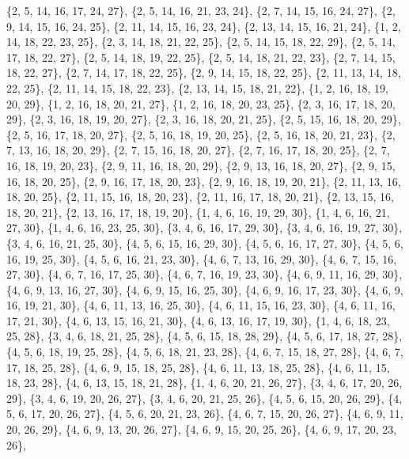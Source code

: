 \documentclass[11pt,a4paper]{article}
\begin{document}
{\{2, 5, 14, 16, 17, 24, 27\}, \{2, 5, 14, 16, 21, 23, 24\}, \{2, 7, 14, 15, 16, 24, 27\}, \{2, 9, 14, 15, 16, 24, 25\}, \{2, 11, 14, 15, 16, 23, 24\},
\{2, 13, 14, 15, 16, 21, 24\}, \{1, 2, 14, 18, 22, 23, 25\}, \{2, 3, 14, 18, 21, 22, 25\}, \{2, 5, 14, 15, 18, 22, 29\}, \{2, 5, 14, 17, 18, 22, 27\},
\{2, 5, 14, 18, 19, 22, 25\}, \{2, 5, 14, 18, 21, 22, 23\}, \{2, 7, 14, 15, 18, 22, 27\}, \{2, 7, 14, 17, 18, 22, 25\}, \{2, 9, 14, 15, 18, 22, 25\},
\{2, 11, 13, 14, 18, 22, 25\}, \{2, 11, 14, 15, 18, 22, 23\}, \{2, 13, 14, 15, 18, 21, 22\}, \{1, 2, 16, 18, 19, 20, 29\}, \{1, 2, 16, 18, 20, 21, 27\},
\{1, 2, 16, 18, 20, 23, 25\}, \{2, 3, 16, 17, 18, 20, 29\}, \{2, 3, 16, 18, 19, 20, 27\}, \{2, 3, 16, 18, 20, 21, 25\}, \{2, 5, 15, 16, 18, 20, 29\},
\{2, 5, 16, 17, 18, 20, 27\}, \{2, 5, 16, 18, 19, 20, 25\}, \{2, 5, 16, 18, 20, 21, 23\}, \{2, 7, 13, 16, 18, 20, 29\}, \{2, 7, 15, 16, 18, 20, 27\},
\{2, 7, 16, 17, 18, 20, 25\}, \{2, 7, 16, 18, 19, 20, 23\}, \{2, 9, 11, 16, 18, 20, 29\}, \{2, 9, 13, 16, 18, 20, 27\}, \{2, 9, 15, 16, 18, 20, 25\},
\{2, 9, 16, 17, 18, 20, 23\}, \{2, 9, 16, 18, 19, 20, 21\}, \{2, 11, 13, 16, 18, 20, 25\}, \{2, 11, 15, 16, 18, 20, 23\}, \{2, 11, 16, 17, 18, 20, 21\},
\{2, 13, 15, 16, 18, 20, 21\}, \{2, 13, 16, 17, 18, 19, 20\}, \{1, 4, 6, 16, 19, 29, 30\}, \{1, 4, 6, 16, 21, 27, 30\}, \{1, 4, 6, 16, 23, 25, 30\},
\{3, 4, 6, 16, 17, 29, 30\}, \{3, 4, 6, 16, 19, 27, 30\}, \{3, 4, 6, 16, 21, 25, 30\}, \{4, 5, 6, 15, 16, 29, 30\}, \{4, 5, 6, 16, 17, 27, 30\},
\{4, 5, 6, 16, 19, 25, 30\}, \{4, 5, 6, 16, 21, 23, 30\}, \{4, 6, 7, 13, 16, 29, 30\}, \{4, 6, 7, 15, 16, 27, 30\}, \{4, 6, 7, 16, 17, 25, 30\},
\{4, 6, 7, 16, 19, 23, 30\}, \{4, 6, 9, 11, 16, 29, 30\}, \{4, 6, 9, 13, 16, 27, 30\}, \{4, 6, 9, 15, 16, 25, 30\}, \{4, 6, 9, 16, 17, 23, 30\},
\{4, 6, 9, 16, 19, 21, 30\}, \{4, 6, 11, 13, 16, 25, 30\}, \{4, 6, 11, 15, 16, 23, 30\}, \{4, 6, 11, 16, 17, 21, 30\}, \{4, 6, 13, 15, 16, 21, 30\},
\{4, 6, 13, 16, 17, 19, 30\}, \{1, 4, 6, 18, 23, 25, 28\}, \{3, 4, 6, 18, 21, 25, 28\}, \{4, 5, 6, 15, 18, 28, 29\}, \{4, 5, 6, 17, 18, 27, 28\},
\{4, 5, 6, 18, 19, 25, 28\}, \{4, 5, 6, 18, 21, 23, 28\}, \{4, 6, 7, 15, 18, 27, 28\}, \{4, 6, 7, 17, 18, 25, 28\}, \{4, 6, 9, 15, 18, 25, 28\},
\{4, 6, 11, 13, 18, 25, 28\}, \{4, 6, 11, 15, 18, 23, 28\}, \{4, 6, 13, 15, 18, 21, 28\}, \{1, 4, 6, 20, 21, 26, 27\}, \{3, 4, 6, 17, 20, 26, 29\},
\{3, 4, 6, 19, 20, 26, 27\}, \{3, 4, 6, 20, 21, 25, 26\}, \{4, 5, 6, 15, 20, 26, 29\}, \{4, 5, 6, 17, 20, 26, 27\}, \{4, 5, 6, 20, 21, 23, 26\},
\{4, 6, 7, 15, 20, 26, 27\}, \{4, 6, 9, 11, 20, 26, 29\}, \{4, 6, 9, 13, 20, 26, 27\}, \{4, 6, 9, 15, 20, 25, 26\}, \{4, 6, 9, 17, 20, 23, 26\},
}
\end{document}
